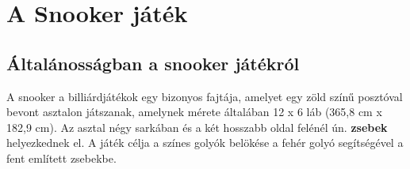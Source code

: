 \chapter{A Snooker játék}

\section{Általánosságban a snooker játékról}
\label{section:snooker_altalanos}
A snooker a billiárdjátékok egy bizonyos fajtája, amelyet egy zöld színű posztóval bevont asztalon játszanak, amelynek mérete általában 12 x 6 láb (365,8 cm x 182,9 cm)\cite{snooker_rules}. Az asztal négy sarkában és a két hosszabb oldal felénél ún. \textbf{zsebek} helyezkednek el. A játék célja a színes golyók belökése a fehér golyó segítségével a fent említett zsebekbe.


